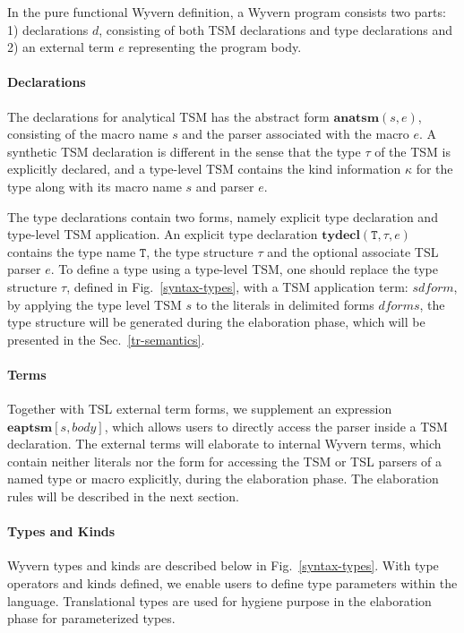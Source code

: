 In the pure functional Wyvern definition, a Wyvern program consists two parts: 1) declarations $d$, consisting of both TSM declarations and type declarations and 2) an external term $e$ representing the program body.

\paragraph{Declarations}
The declarations for analytical TSM has the abstract form $\mathbf{anatsm}(s,e)$, consisting of the macro name $s$ and the parser associated with the macro $e$. A synthetic TSM declaration is different in the sense that the type $\tau$ of the TSM is explicitly declared, and a type-level TSM contains the kind information $\kappa$ for the type along with its macro name $s$ and parser $e$.

The type declarations contain two forms, namely explicit type declaration and type-level TSM application. An explicit type declaration $\mathbf{tydecl}(\mathtt{T},\tau,e)$ contains the type name $\mathtt{T}$, the type structure $\tau$ and the optional associate TSL parser $e$. To define a type using a type-level TSM, one should replace the type structure $\tau$, defined in Fig.~\ref{syntax-types}, with a TSM application term: $s \mathit{dform}$, by applying the type level TSM $s$ to the literals in delimited forms $\mathit{dforms}$, the type structure will be generated during the elaboration phase, which will be presented in the Sec.~\ref{tr-semantics}.

\paragraph{Terms} Together with TSL external term forms, we supplement an expression $\mathbf{eaptsm}[s,body]$, which allows users to directly access the parser inside a TSM declaration. The external terms will elaborate to internal Wyvern terms, which contain neither literals nor the form for accessing the TSM or TSL parsers of a named type or macro explicitly, during the elaboration phase. The elaboration rules will be described in the next section.

\paragraph{Types and Kinds}
Wyvern types and kinds are described below in Fig.~\ref{syntax-types}. With type operators and kinds defined, we enable users to define type parameters within the language. Translational types are used for hygiene purpose in the elaboration phase for parameterized types.

